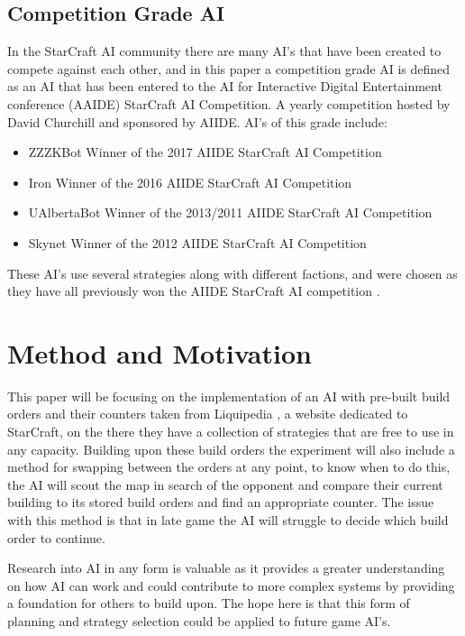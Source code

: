 \documentclass[journal]{IEEEtran}
\begin{document}
\subsection{Competition Grade AI}
In the StarCraft AI community there are many AI's that have been created to compete against each other, and in this paper a competition grade AI is defined as an AI that has been entered to the AI for Interactive Digital Entertainment conference (AAIDE) StarCraft AI Competition. A yearly competition hosted by David Churchill and sponsored by AIIDE. AI's of this grade include:
\begin{itemize}
	\item ZZZKBot Winner of the 2017 AIIDE StarCraft AI Competition \cite{ZZZK}
	\item Iron Winner of the 2016 AIIDE StarCraft AI Competition \cite{Iron}
	\item UAlbertaBot Winner of the 2013/2011 AIIDE StarCraft AI Competition \cite{UAlbertaBotBot}
	\item Skynet Winner of the 2012 AIIDE StarCraft AI Competition \cite{Skynet}
\end{itemize}

These AI's use several strategies along with different factions, and were chosen as they have all previously won the AIIDE StarCraft AI competition \cite{Results}.

\section{Method and Motivation}
This paper will be focusing on the implementation of an AI with pre-built build orders and their counters taken from Liquipedia \cite{Liquid}, a website dedicated to StarCraft, on the there they have a collection of strategies that are free to use in any capacity. Building upon these build orders the experiment will also include a method for swapping between the orders at any point, to know when to do this, the AI will scout the map in search of the opponent and compare their current building to its stored build orders and find an appropriate counter. The issue with this method is that in late game the AI will struggle to decide which build order to continue. 

Research into AI in any form is valuable as it provides a greater understanding on how AI can work and could contribute to more complex systems by providing a foundation for others to build upon. The hope here is that this form of planning and strategy selection could be applied to future game AI's.
\end{document}
